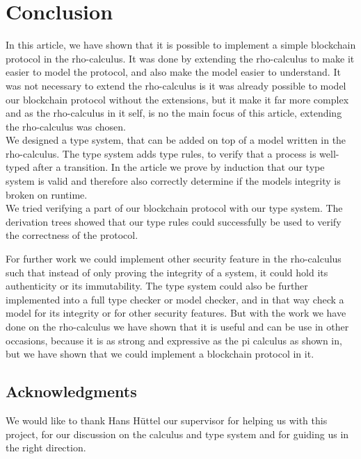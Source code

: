 \section{Conclusion}

In this article, we have shown that it is possible to implement a simple blockchain protocol in the rho-calculus. It was done by extending the rho-calculus to make it easier to model the protocol, and also make the model easier to understand. It was not necessary to extend the rho-calculus is it was already possible to model our blockchain protocol without the extensions, but it make it far more complex and as the rho-calculus in it self, is no the main focus of this article, extending the rho-calculus was chosen.\\
We designed a type system, that can be added on top of a model written in the rho-calculus. The type system adds type rules, to verify that a process is well-typed after a transition. In the article we prove by induction that our type system is valid and therefore also correctly determine if the models integrity is broken on runtime.\\
We tried verifying a part of our blockchain protocol with our type system. The derivation trees showed that our type rules could successfully be used to verify the correctness of the protocol.

For further work we could implement other security feature in the rho-calculus such that instead of only proving the integrity of a system, it could hold its authenticity or its immutability. The type system could also be further implemented into a full type checker or model checker, and in that way check a model for its integrity or for other security features. But with the work we have done on the rho-calculus we have shown that it is useful and can be use in other occasions, because it is as strong and expressive as the pi calculus as shown in\citep{Meredith2005}, but we have shown that we could implement a blockchain protocol in it.





\subsection*{Acknowledgments}
We would like to thank Hans Hüttel our supervisor for helping us with this project, for our discussion on the calculus and type system and for guiding us in the right direction.
